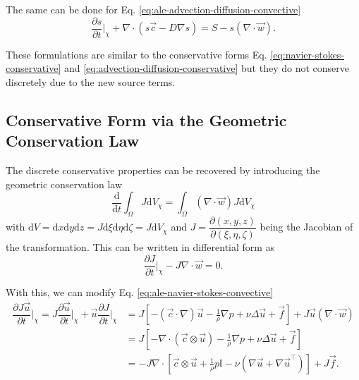 \documentclass{article}
\newcommand{\dd}{\mathrm{d}}
\newcommand{\pd}[2]{\dfrac{\partial #1}{\partial #2}}
\begin{document}
The same can be done for Eq. \eqref{eq:ale-advection-diffusion-convective}
\begin{equation}
    \pd{s}{t}\bigg|_\chi + \nabla \cdot \left(
        s \vec{c} -
        D \nabla s
    \right) = S - s \left(\nabla \cdot \vec{w}\right).
\end{equation}

These formulations are similar to the conservative forms Eq. \eqref{eq:navier-stokes-conservative} and \eqref{eq:advection-diffusion-conservative} but they do not conserve discretely due to the new source terms.

\subsection{Conservative Form via the Geometric Conservation Law}

The discrete conservative properties can be recovered by introducing the geometric conservation law \cite{thomasGeometricConservationLaw1979}
\begin{equation}
    \frac{\dd}{\dd t} \int_\Omega J \dd V_\chi = \int_\Omega \left(\nabla \cdot \vec{w}\right) J \dd V_\chi
\end{equation}
with $\dd V = \dd x \dd y \dd z = J \dd \xi \dd \eta \dd \zeta = J \dd V_\chi$ and
$J = \pd{(x, y, z)}{(\xi, \eta, \zeta)}$ being the Jacobian of the transformation.
This can be written in differential form as
\begin{equation}
    \pd{J}{t}\bigg|_\chi - J \nabla \cdot \vec{w} = 0.
    \label{eq:geometric-conservation-law}
\end{equation}

With this, we can modify Eq. \eqref{eq:ale-navier-stokes-convective}
\begin{equation}
    \begin{split}
        \pd{J\vec{u}}{t}\bigg|_\chi =
        J\pd{\vec{u}}{t}\bigg|_\chi + \vec{u}\pd{J}{t}\bigg|_\chi &=
        J \left[
            - \left(\vec{c} \cdot \nabla\right) \vec{u}
            - \frac{1}{\rho} \nabla p
            + \nu \Delta \vec{u}
            + \vec{f}
        \right] +
        J \vec{u} \left(\nabla \cdot \vec{w}\right) \\
        &=
        J \left[
            - \nabla \cdot \left(\vec{c} \otimes \vec{u}\right)
            - \frac{1}{\rho} \nabla p
            + \nu \Delta \vec{u}
            + \vec{f}
        \right] \\
        &=
        -J \nabla \cdot \left[
            \vec{c} \otimes \vec{u}
            + \frac{1}{\rho} p \mathbb{I}
            - \nu \left(\nabla \vec{u} + \nabla \vec{u}^\top\right)
        \right]
        + J \vec{f}.
    \end{split}
\end{equation}
\end{document}
